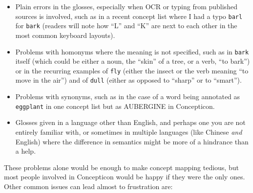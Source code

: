 \documentclass[
  a4paper,
  14pt,
  oneside,
  tablecaptionabove
]{scrbook}
\newcommand{\passthrough}[1]{#1}
\begin{document}
\begin{itemize}
\item Plain errors in the
glosses, especially when OCR or typing from published sources is
involved, such as in a recent concept list where I had a typo
\passthrough{\lstinline!barl!} for \passthrough{\lstinline!bark!}
(readers will note how \enquote{L} and \enquote{K} are next to each
other in the most common keyboard layouts).
\item Problems with homonyms
where the meaning is not specified, such as in
\passthrough{\lstinline!bark!} itself (which could be either a noun, the
\enquote{skin} of a tree, or a verb, \enquote{to bark}) or in the
recurring examples of \passthrough{\lstinline!fly!} (either the insect
or the verb meaning \enquote{to move in the air}) and of
\passthrough{\lstinline!dull!} (either as opposed to \enquote{sharp} or
to \enquote{smart}).
\item Problems with synonyms, such as in the case of a
word being annotated as \passthrough{\lstinline!eggplant!} in one
concept list but as AUBERGINE in Concepticon.
\item Glosses given in a
language other than English, and perhaps one you are not entirely
familiar with, or sometimes in multiple languages (like Chinese
\emph{and} English) where the difference in semantics might be more of a
hindrance than a help.
\end{itemize}


These problems alone would be enough to make concept mapping tedious,
but most people involved in Concepticon would be happy if they were the
only ones. Other common issues can lead almost to frustration are:
\end{document}

